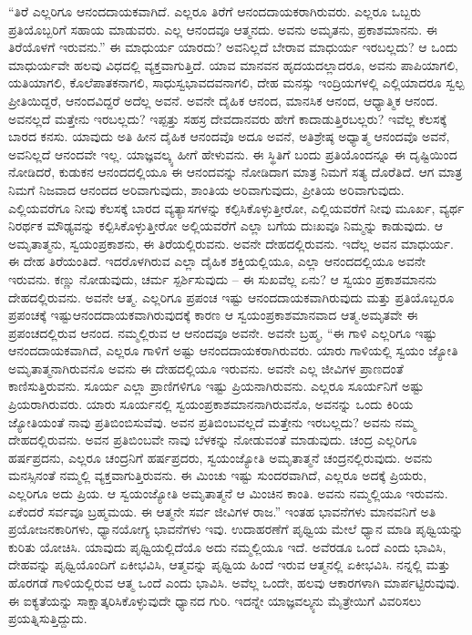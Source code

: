 “ತಿರೆ ಎಲ್ಲರಿಗೂ ಆನಂದದಾಯಕವಾಗಿದೆ. ಎಲ್ಲರೂ ತಿರೆಗೆ ಆನಂದದಾಯಕರಾಗಿರುವರು. ಎಲ್ಲರೂ ಒಬ್ಬರು ಪ್ರತಿಯೊಬ್ಬರಿಗೆ ಸಹಾಯ ಮಾಡುವರು. ಎಲ್ಲ ಆನಂದವೂ ಆತ್ಮನದು. ಅವನು ಅಮೃತನು, ಪ್ರಕಾಶಮಾನನು. ಈ ತಿರೆಯೊಳಗೆ ಇರುವನು.” ಈ ಮಾಧುರ್ಯ ಯಾರದು? ಅವನಿಲ್ಲದೆ ಬೇರಾವ ಮಾಧುರ್ಯ ಇರಬಲ್ಲದು? ಆ ಒಂದು ಮಾಧುರ್ಯವೇ ಹಲವು ವಿಧದಲ್ಲಿ ವ್ಯಕ್ತವಾಗುತ್ತಿದೆ. ಯಾವ ಮಾನವನ ಹೃದಯದಲ್ಲಾದರೂ, ಅವನು ಪಾಪಿಯಾಗಲಿ, ಯತಿಯಾಗಲಿ, ಕೊಲೆಪಾತಕನಾಗಲಿ, ಸಾಧುಸ್ವಭಾವದವನಾಗಲಿ, ದೇಹ ಮನಸ್ಸು ಇಂದ್ರಿಯಗಳಲ್ಲಿ ಎಲ್ಲಿಯಾದರೂ ಸ್ವಲ್ಪ ಪ್ರೀತಿಯಿದ್ದರೆ, ಆನಂದವಿದ್ದರೆ ಅದೆಲ್ಲ ಅವನೆ. ಅವನೇ ದೈಹಿಕ ಆನಂದ, ಮಾನಸಿಕ ಆನಂದ, ಆಧ್ಯಾತ್ಮಿಕ ಆನಂದ. ಅವನಲ್ಲದೆ ಮತ್ತೇನು ಇರಬಲ್ಲದು? ಇಪ್ಪತ್ತು ಸಹಸ್ರ ದೇವದಾನವರು ಹೇಗೆ ಕಾದಾಡುತ್ತಿರಬಲ್ಲರು? ಇವೆಲ್ಲ ಕೆಲಸಕ್ಕೆ ಬಾರದ ಕನಸು. ಯಾವುದು ಅತಿ ಹೀನ ದೈಹಿಕ ಆನಂದವೊ ಅದೂ ಅವನೆ, ಅತಿಶ್ರೇಷ್ಠ ಅಧ್ಯಾತ್ಮ ಆನಂದವೊ ಅವನೆ, ಅವನಿಲ್ಲದೆ ಆನಂದವೇ ಇಲ್ಲ. ಯಾಜ್ಞವಲ್ಕ್ಯ ಹೀಗೆ ಹೇಳುವನು. ಈ ಸ್ಥಿತಿಗೆ ಬಂದು ಪ್ರತಿಯೊಂದನ್ನೂ ಈ ದೃಷ್ಟಿಯಿಂದ ನೋಡಿದರೆ, ಕುಡುಕನ ಆನಂದದಲ್ಲಿಯೂ ಈ ಆನಂದವನ್ನು ನೋಡಿದಾಗ ಮಾತ್ರ ನಿಮಗೆ ಸತ್ಯ ದೊರೆತಿದೆ. ಆಗ ಮಾತ್ರ ನಿಮಗೆ ನಿಜವಾದ ಆನಂದದ ಅರಿವಾಗುವುದು, ಶಾಂತಿಯ ಅರಿವಾಗುವುದು, ಪ್ರೀತಿಯ ಅರಿವಾಗುವುದು. ಎಲ್ಲಿಯವರೆಗೂ ನೀವು ಕೆಲಸಕ್ಕೆ ಬಾರದ ವ್ಯತ್ಯಾಸಗಳನ್ನು ಕಲ್ಪಿಸಿಕೊಳ್ಳುತ್ತೀರೋ, ಎಲ್ಲಿಯವರೆಗೆ ನೀವು ಮೂರ್ಖ, ವ್ಯರ್ಥ ನಿರರ್ಥಕ ಮೌಢ್ಯವನ್ನು ಕಲ್ಪಿಸಿಕೊಳ್ಳುತ್ತೀರೋ ಅಲ್ಲಿಯವರೆಗೆ ಎಲ್ಲಾ ಬಗೆಯ ದುಃಖವೂ ನಿಮ್ಮನ್ನು ಕಾಡುವುದು. ಆ ಅಮೃತಾತ್ಮನು, ಸ್ವಯಂಪ್ರಕಾಶನು, ಈ ತಿರೆಯಲ್ಲಿರುವನು. ಅವನೇ ದೇಹದಲ್ಲಿರುವನು. ಇದೆಲ್ಲ ಅವನ ಮಾಧುರ್ಯ. ಈ ದೇಹ ತಿರೆಯಂತಿದೆ. ಇದರೊಳಗಿರುವ ಎಲ್ಲಾ ದೈಹಿಕ ಶಕ್ತಿಯಲ್ಲಿಯೂ, ಎಲ್ಲಾ ಆನಂದದಲ್ಲಿಯೂ ಅವನೇ ಇರುವನು. ಕಣ್ಣು ನೋಡುವುದು, ಚರ್ಮ ಸ್ಪರ್ಶಿಸುವುದು – ಈ ಸುಖವೆಲ್ಲ ಏನು? ಆ ಸ್ವಯಂ ಪ್ರಕಾಶಮಾನನು ದೇಹದಲ್ಲಿರುವನು. ಅವನೇ ಆತ್ಮ. ಎಲ್ಲರಿಗೂ ಪ್ರಪಂಚ ಇಷ್ಟು ಆನಂದದಾಯಕವಾಗಿರುವುದು ಮತ್ತು ಪ್ರತಿಯೊಬ್ಬರೂ ಪ್ರಪಂಚಕ್ಕೆ ಇಷ್ಟು\break ಆನಂದದಾಯಕವಾಗಿರುವುದಕ್ಕೆ ಕಾರಣ ಆ ಸ್ವಯಂಪ್ರಕಾಶಮಾನವಾದ ಆತ್ಮ.\break ಅಮೃತವೇ ಈ ಪ್ರಪಂಚದಲ್ಲಿರುವ ಆನಂದ. ನಮ್ಮಲ್ಲಿರುವ ಆ ಆನಂದವೂ ಅವನೇ. ಅವನೇ ಬ್ರಹ್ಮ, “ಈ ಗಾಳಿ ಎಲ್ಲರಿಗೂ ಇಷ್ಟು ಆನಂದದಾಯಕವಾಗಿದೆ, ಎಲ್ಲರೂ ಗಾಳಿಗೆ ಅಷ್ಟು ಆನಂದದಾಯಕರಾಗಿರುವರು. ಯಾರು ಗಾಳಿಯಲ್ಲಿ ಸ್ವಯಂ ಜ್ಯೋತಿ ಅಮೃತಾತ್ಮನಾಗಿರುವನೊ ಅವನು ಈ ದೇಹದಲ್ಲಿಯೂ ಇರುವನು. ಅವನೇ ಎಲ್ಲ ಜೀವಿಗಳ ಪ್ರಾಣದಂತೆ ಕಾಣಿಸುತ್ತಿರುವನು. ಸೂರ್ಯ ಎಲ್ಲಾ ಪ್ರಾಣಿಗಳಿಗೂ ಇಷ್ಟು ಪ್ರಿಯನಾಗಿರುವನು. ಎಲ್ಲರೂ ಸೂರ್ಯನಿಗೆ ಅಷ್ಟು ಪ್ರಿಯರಾಗಿರುವರು. ಯಾರು ಸೂರ್ಯನಲ್ಲಿ ಸ್ವಯಂಪ್ರಕಾಶಮಾನನಾಗಿರುವನೊ, ಅವನನ್ನು ಒಂದು ಕಿರಿಯ ಜ್ಯೋತಿಯಂತೆ ನಾವು ಪ್ರತಿಬಿಂಬಿಸುವೆವು. ಅವನ ಪ್ರತಿಬಿಂಬವಲ್ಲದೆ ಮತ್ತೇನು ಇರಬಲ್ಲದು? ಅವನು ನಮ್ಮ ದೇಹದಲ್ಲಿರುವನು. ಅವನ ಪ್ರತಿಬಿಂಬವೇ ನಾವು ಬೆಳಕನ್ನು ನೋಡುವಂತೆ ಮಾಡುವುದು. ಚಂದ್ರ ಎಲ್ಲರಿಗೂ ಹರ್ಷಪ್ರದನು, ಎಲ್ಲರೂ ಚಂದ್ರನಿಗೆ ಹರ್ಷಪ್ರದರು, ಸ್ವಯಂಜ್ಯೋತಿ ಅಮೃತಾತ್ಮನೆ ಚಂದ್ರನಲ್ಲಿರುವುದು. ಅವನು ಮನಸ್ಸಿನಂತೆ ನಮ್ಮಲ್ಲಿ ವ್ಯಕ್ತವಾಗುತ್ತಿರುವನು. ಈ ಮಿಂಚು ಇಷ್ಟು ಸುಂದರವಾಗಿದೆ, ಎಲ್ಲರೂ ಅದಕ್ಕೆ ಪ್ರಿಯರು, ಎಲ್ಲರಿಗೂ ಅದು ಪ್ರಿಯ. ಆ ಸ್ವಯಂಜ್ಯೋತಿ ಅಮೃತಾತ್ಮನೆ ಆ ಮಿಂಚಿನ ಕಾಂತಿ. ಅವನು ನಮ್ಮಲ್ಲಿಯೂ ಇರುವನು. ಏಕೆಂದರೆ ಸರ್ವವೂ ಬ್ರಹ್ಮಮಯ. ಈ ಆತ್ಮನೇ ಸರ್ವ ಜೀವಿಗಳ ರಾಜ.” ಇಂತಹ ಭಾವನೆಗಳು ಮಾನವನಿಗೆ ಅತಿ ಪ್ರಯೋಜನಕಾರಿಗಳು, ಧ್ಯಾನಯೋಗ್ಯ ಭಾವನೆಗಳು ಇವು. ಉದಾಹರಣೆಗೆ ಪೃಥ್ವಿಯ ಮೇಲೆ ಧ್ಯಾನ ಮಾಡಿ ಪೃಥ್ವಿಯನ್ನು ಕುರಿತು ಯೋಚಿಸಿ. ಯಾವುದು ಪೃಥ್ವಿಯಲ್ಲಿದೆಯೊ ಅದು ನಮ್ಮಲ್ಲಿಯೂ ಇದೆ. ಅವೆರಡೂ ಒಂದೆ ಎಂದು ಭಾವಿಸಿ, ದೇಹವನ್ನು ಪೃಥ್ವಿಯೊಂದಿಗೆ ಏಕೀಭವಿಸಿ, ಆತ್ಮವನ್ನು ಪೃಥ್ವಿಯ ಹಿಂದೆ ಇರುವ ಆತ್ಮನಲ್ಲಿ ಏಕೀಭವಿಸಿ. ನನ್ನಲ್ಲಿ ಮತ್ತು ಹೊರಗಡೆ ಗಾಳಿಯಲ್ಲಿರುವ ಆತ್ಮ ಒಂದೆ ಎಂದು ಭಾವಿಸಿ. ಅವೆಲ್ಲ ಒಂದೇ, ಹಲವು ಆಕಾರಗಳಾಗಿ ಮಾರ್ಪಟ್ಟಿರುವುವು. ಈ ಐಕ್ಯತೆಯನ್ನು ಸಾಕ್ಷಾತ್ಕರಿಸಿಕೊಳ್ಳುವುದೇ ಧ್ಯಾನದ ಗುರಿ. ಇದನ್ನೇ ಯಾಜ್ಞವಲ್ಕ್ಯನು ಮೈತ್ರೇಯಿಗೆ ವಿವರಿಸಲು ಪ್ರಯತ್ನಿಸುತ್ತಿದ್ದುದು.

